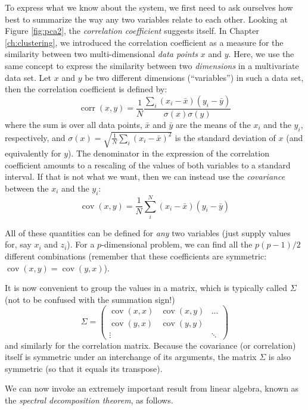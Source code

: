 To express what we know about the system, we first need to ask
ourselves how best to summarize the way any two variables relate to
each other. Looking at Figure \ref{fig:pca2}, the \emph{correlation
  coefficient}  suggests itself.  In Chapter \ref{ch:clustering}, we
introduced the correlation coefficient as a measure for the similarity
between two multi-dimensional \emph{data points} $x$ and $y$. Here, we
use the same concept to express the similarity between two
\emph{dimensions} in a multivariate data set. Let $x$ and $y$ be two
different dimensions (``variables'') in such a data set, then the
correlation coefficient is defined by:
%
\[ 
\operatorname{corr}(x,y) 
  = \frac{1}{N}
    \frac{ \sum_i ( x_i - \bar{x} ) ( y_i - \bar{y} ) } 
         { \sigma(x) \sigma(y) }
\]
%
where the sum is over all data points, $\bar{x}$ and $\bar{y}$ are the
means of the $x_i$ and the $y_i$, respectively, and $\sigma(x) = \sqrt{
  \frac{1}{N} \sum_i (x_i - \bar{x})^2 }$ is the standard deviation of
$x$ (and equivalently for $y$). The denominator in the expression of
the correlation coefficient amounts to a rescaling of the values of
both variables to a standard interval. If that is not what we want,
then we can instead use the \emph{covariance} between the $x_i$ and
the $y_i$:
%
\[ 
\operatorname{cov}(x,y)
   = \frac{1}{N} \sum_i^N ( x_i - \bar{x} ) ( y_i - \bar{y} ) 
\]
%

All of these quantities can be defined for \emph{any} two variables
(just supply values for, say $x_i$ and $z_i$). For a $p$-dimensional
problem, we can find all the $p(p-1)/2$ different combinations
(remember that these coefficients are symmetric:
$\operatorname{cov}(x,y) = \operatorname{cov}(y,x)$).

It is now convenient to group the values in a matrix, which is
typically called $\Sigma$ (not to be confused with the summation
sign!)
%
\[
\Sigma = 
\begin{pmatrix}
\operatorname{cov}(x,x) & \operatorname{cov}(x,y) & \dots \\
\operatorname{cov}(y,x) & \operatorname{cov}(y,y) & \\
\vdots &  & \ddots 
\end{pmatrix}
\]
%
and similarly for the correlation matrix. Because the covariance (or
correlation) itself is symmetric under an interchange of its
arguments, the matrix $\Sigma$ is also symmetric (so that it equals
its transpose).

We can now invoke an extremely important result from linear algebra,
known as the \emph{spectral decomposition theorem},  as follows.

